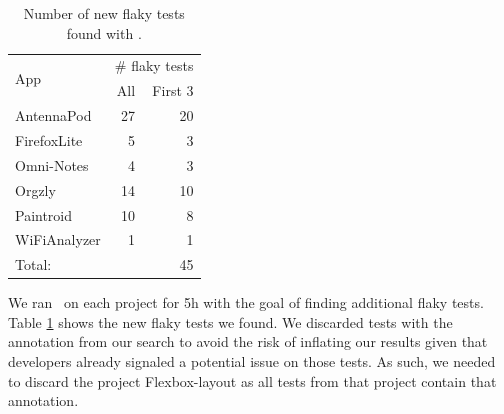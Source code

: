 \documentclass[conference]{IEEEtran}
\begin{document}
\begin{table}
\vspace{-4ex}
\caption{Number of new flaky tests found with \tname.}
\label{tab:new-tests}
\centering
\small
\begin{tabular}{lrr}
\hline
\toprule
\multirow{2}{*}{App} & \multicolumn{2}{c}{\# flaky tests} \\
\cline{2-3}
       & All & First 3 \\ 
\midrule
AntennaPod     & 27 & 20 \\ 
FirefoxLite    & 5 & 3\\ 
Omni-Notes     & 4 & 3\\ 
Orgzly         & 14 & 10\\ 
Paintroid      & 10 & 8\\ 
WiFiAnalyzer   & 1 & 1\\ 
\midrule
Total:         & \numTotalNewFlaky{} & 45\\ 
\bottomrule
\end{tabular}
\end{table}

 
We ran \tname\ on each project for 5h with the goal of finding additional flaky tests. Table \ref{tab:new-tests} shows the new flaky tests we found. We discarded tests with the  annotation from our search to avoid the risk of inflating our results given that developers already signaled a potential issue on those tests. As such, we needed to discard the project Flexbox-layout as all tests from that project contain that annotation.
\end{document}
